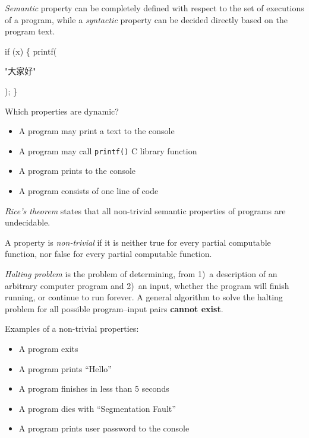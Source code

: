 \documentclass{article}
\begin{document}

\pptToc



\emph{Semantic} property can be completely defined with respect to the set of executions of a program,
while a \emph{syntactic} property can be decided directly based on the program text.

{\ttfamily if (x) \{ printf(\begin{CJK}{UTF8}{gbsn}"大家好"\end{CJK}); \}}

Which properties are dynamic?
\begin{itemize}\setlength\itemsep{0pt}
\item A program may print a text to the console
\item A program may call \texttt{printf()} C library function
\item A program prints to the console
\item A program consists of one line of code
\end{itemize}

\plush{}


\emph{Rice's theorem} states that all non-trivial semantic properties of programs are undecidable.

A property is \emph{non-trivial} if it is neither true for every partial computable function, nor false for every partial computable function.

\emph{Halting problem} is the problem of determining, from 1)~a description of an arbitrary computer program and 2)~an input, whether the program will finish running, or continue to run forever. A general algorithm to solve the halting problem for all possible program–input pairs \textbf{cannot exist}.

\plush{}


Examples of a non-trivial properties:

\begin{itemize}\setlength\itemsep{0pt}
\item A program exits
\item A program prints ``Hello''
\item A program finishes in less than 5 seconds
\item A program dies with ``Segmentation Fault''
\item A program prints user password to the console
\end{itemize}
\end{document}
